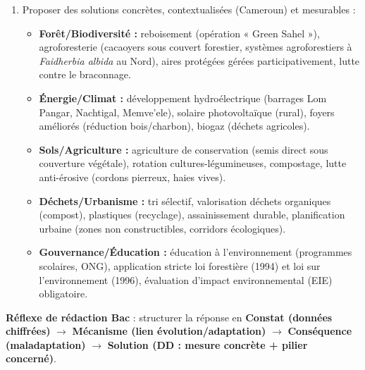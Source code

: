 \documentclass[11pt]{article}
\newcommand{\cle}[1]{{\popxbold\color{popdark}#1}}
\begin{document}
\begin{methode}
\begin{enumerate}
\item \cle{Proposer} des solutions concrètes, contextualisées (Cameroun) et mesurables :
\begin{itemize}
\item \textbf{Forêt/Biodiversité :} reboisement (opération « Green Sahel »), agroforesterie (cacaoyers sous couvert forestier, systèmes agroforestiers à \emph{Faidherbia albida} au Nord), aires protégées gérées participativement, lutte contre le braconnage.
\item \textbf{Énergie/Climat :} développement hydroélectrique (barrages Lom Pangar, Nachtigal, Memve'ele), solaire photovoltaïque (rural), foyers améliorés (réduction bois/charbon), biogaz (déchets agricoles).
\item \textbf{Sols/Agriculture :} agriculture de conservation (semis direct sous couverture végétale), rotation cultures-légumineuses, compostage, lutte anti-érosive (cordons pierreux, haies vives).
\item \textbf{Déchets/Urbanisme :} tri sélectif, valorisation déchets organiques (compost), plastiques (recyclage), assainissement durable, planification urbaine (zones non constructibles, corridors écologiques).
\item \textbf{Gouvernance/Éducation :} éducation à l'environnement (programmes scolaires, ONG), application stricte loi forestière (1994) et loi sur l'environnement (1996), évaluation d'impact environnemental (EIE) obligatoire.
\end{itemize}
\end{enumerate}
\textbf{Réflexe de rédaction Bac} : structurer la réponse en \textbf{Constat (données chiffrées)} $\rightarrow$ \textbf{Mécanisme (lien évolution/adaptation)} $\rightarrow$ \textbf{Conséquence (maladaptation)} $\rightarrow$ \textbf{Solution (DD : mesure concrète + pilier concerné)}.
\end{methode}
\end{document}
